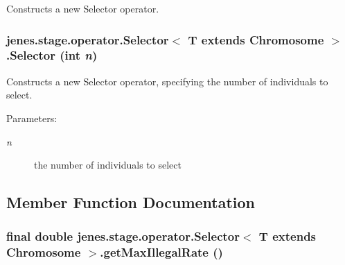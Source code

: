 Constructs a new Selector operator. \hypertarget{classjenes_1_1stage_1_1operator_1_1_selector_3_01_t_01extends_01_chromosome_01_4_07f05455c1fabfb8ad3f6468a653aed8}{
\subsubsection[Selector]{\setlength{\rightskip}{0pt plus 5cm}jenes.stage.operator.Selector$<$ T extends Chromosome $>$.Selector (int {\em n})}}
\label{classjenes_1_1stage_1_1operator_1_1_selector_3_01_t_01extends_01_chromosome_01_4_07f05455c1fabfb8ad3f6468a653aed8}


Constructs a new Selector operator, specifying the number of individuals to select.

\begin{Desc}
\item[Parameters:]
\begin{description}
\item[{\em n}]the number of individuals to select \end{description}
\end{Desc}


\subsection{Member Function Documentation}
\hypertarget{classjenes_1_1stage_1_1operator_1_1_selector_3_01_t_01extends_01_chromosome_01_4_6e6f7842d22da347196a8cd772bea0e1}{
\subsubsection[getMaxIllegalRate]{\setlength{\rightskip}{0pt plus 5cm}final double jenes.stage.operator.Selector$<$ T extends Chromosome $>$.getMaxIllegalRate ()}}
\label{classjenes_1_1stage_1_1operator_1_1_selector_3_01_t_01extends_01_chromosome_01_4_6e6f7842d22da347196a8cd772bea0e1}


